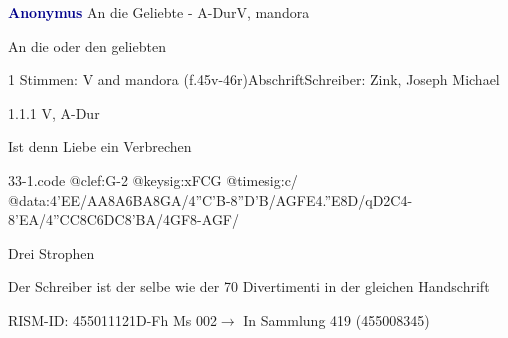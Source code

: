 \documentclass[twocolumn]{book}
\begin{document}
\par \vspace{7pt} \textcolor{darkblue}{\textbf{Anonymus  }}\hfillplus{\textbf{[33]}}\newline An die Geliebte - A-Dur\newline V, mandora
\par \begin{itshape}[heading, f.45v:] An die oder den geliebten\end{itshape} 
\par \textcolor{darkblue}{}  1 Stimmen: V and mandora  (f.45v-46r)\newline Abschrift\newline Schreiber: Zink, Joseph Michael
\par 1.1.1  V, A-Dur\newline \begin{footnotesize} Ist denn Liebe ein Verbrechen \end{footnotesize}  
\begin{filecontents*}{33-1.code}
@clef:G-2
@keysig:xFCG
@timesig:c/
@data:4'EE/AA{8A6BA}8GA/4''C'B-8''D'B/{AG}{FE}4.''E8D/qD2C4-8'EA/4''CC{8C6DC}8'BA/4GF8-AGF/
\end{filecontents*}
\newline
%
\par Drei Strophen
\par Der Schreiber ist der selbe wie der 70 Divertimenti in der gleichen Handschrift
\par RISM-ID: 455011121\newline D-Fh  Ms 002\newline $\rightarrow$ In Sammlung 419 (455008345)
      
\end{document}
